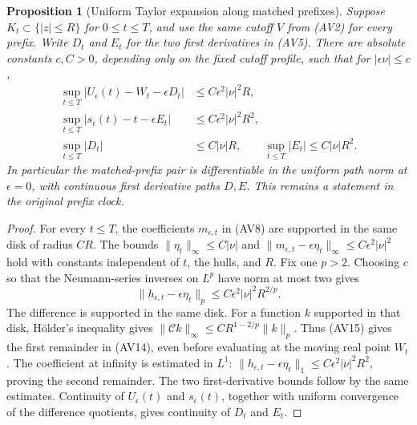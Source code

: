 \documentclass[11pt]{article}
\newtheorem{proposition}[theorem]{Proposition}
\theoremstyle{definition}\newtheorem{definition}[theorem]{Definition}
\theoremstyle{remark}\newtheorem{remark}[theorem]{Remark}
\begin{document}
\begin{proposition}[Uniform Taylor expansion along matched prefixes]
\label{prop:affine-prefix-taylor}
Suppose $K_t\subset\{|z|\le R\}$ for $0\le t\le T$, and use the
same cutoff $V$ from (AV2) for every prefix. Write $D_t$ and $E_t$
for the two first derivatives in (AV5). There are absolute constants
$c,C>0$, depending only on the fixed cutoff profile, such that for
$|\epsilon\nu|\le c$,
\[
 \begin{split}
 \sup_{t\le T}|U_\epsilon(t)-W_t-\epsilon D_t|
       &\le C\epsilon^2|\nu|^2R,\\
 \sup_{t\le T}|s_\epsilon(t)-t-\epsilon E_t|
       &\le C\epsilon^2|\nu|^2R^2,\\
 \sup_{t\le T}|D_t|&\le C|\nu|R,\qquad
 \sup_{t\le T}|E_t|\le C|\nu|R^2.
 \end{split}
 \tag{AV14}
\]
In particular the matched-prefix pair is differentiable in the
uniform path norm at $\epsilon=0$, with continuous first derivative
paths $D,E$. This remains a statement in the original prefix clock.
\end{proposition}
\begin{proof}
For every $t\le T$, the coefficients $m_{\epsilon,t}$ in (AV8)
are supported in the same disk of radius $CR$. The bounds
$\|\eta_t\|_\infty\le C|\nu|$ and
$\|m_{\epsilon,t}-\epsilon\eta_t\|_\infty
\le C\epsilon^2|\nu|^2$ hold with constants independent of $t$,
the hulls, and $R$. Fix one $p>2$. Choosing $c$ so that the
Neumann-series inverses on $L^p$ have norm at most two gives
\[
 \|h_{\epsilon,t}-\epsilon\eta_t\|_p
       \le C\epsilon^2|\nu|^2R^{2/p}.
 \tag{AV15}
\]
The difference is supported in the same disk. For a function $k$
supported in that disk, H\"older's inequality gives
$\|\mathcal Ck\|_\infty\le CR^{1-2/p}\|k\|_p$.
Thus (AV15) gives the first remainder in (AV14), even before
evaluating at the moving real point $W_t$. The coefficient at
infinity is estimated in $L^1$:
$\|h_{\epsilon,t}-\epsilon\eta_t\|_1
\le C\epsilon^2|\nu|^2R^2$, proving the second remainder.
The two first-derivative bounds follow by the same estimates.
Continuity of $U_\epsilon(t)$ and $s_\epsilon(t)$, together with
uniform convergence of the difference quotients, gives continuity
of $D_t$ and $E_t$.
\end{proof}
\end{document}
